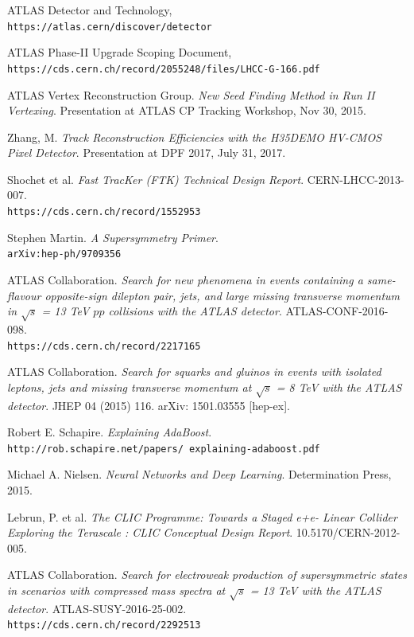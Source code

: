 \documentclass{article}
\begin{document}
\begin{thebibliography}{9}

ATLAS Detector and Technology,
\\\texttt{https://atlas.cern/discover/detector}


ATLAS Phase-II Upgrade Scoping Document,
\\\texttt{https://cds.cern.ch/record/2055248/files/LHCC-G-166.pdf}

ATLAS Vertex Reconstruction Group.
\textit{New Seed Finding Method in Run II Vertexing}.
Presentation at ATLAS CP Tracking Workshop, Nov 30, 2015.

Zhang, M.
\textit{Track Reconstruction Efficiencies with the H35DEMO HV-CMOS Pixel Detector}.
Presentation at DPF 2017, July 31, 2017.

Shochet et al.
\textit{Fast TracKer (FTK) Technical Design Report}.
CERN-LHCC-2013-007.
\\\texttt{https://cds.cern.ch/record/1552953}

Stephen Martin. 
\textit{A Supersymmetry Primer}. 
\\\texttt{arXiv:hep-ph/9709356}

ATLAS Collaboration.
\textit{Search for new phenomena in events containing a same-flavour opposite-sign dilepton pair, jets, and large missing transverse momentum in $\sqrt{s}$ = 13 TeV $pp$ collisions with the ATLAS detector}.
ATLAS-CONF-2016-098.
\\\texttt{https://cds.cern.ch/record/2217165}

ATLAS Collaboration.
\textit{Search for squarks and gluinos in events with isolated leptons, jets and missing transverse momentum at $\sqrt{s}$ = 8 TeV with the ATLAS detector}.
JHEP 04 (2015) 116.
arXiv: 1501.03555 [hep-ex].

Robert E. Schapire.
\textit{Explaining AdaBoost}.
\\\texttt{http://rob.schapire.net/papers/ explaining-adaboost.pdf}

Michael A. Nielsen.
\textit{Neural Networks and Deep Learning}.
Determination Press, 2015.

Lebrun, P. et al.
\textit{The CLIC Programme: Towards a Staged e+e- Linear Collider Exploring the Terascale : CLIC Conceptual Design Report}.
10.5170/CERN-2012-005.

ATLAS Collaboration.
\textit{Search for electroweak production of supersymmetric states in scenarios with compressed mass spectra at $\sqrt{s}$ = 13 TeV with the ATLAS detector}.
ATLAS-SUSY-2016-25-002.
\\\texttt{https://cds.cern.ch/record/2292513}

\end{thebibliography}
\end{document}
